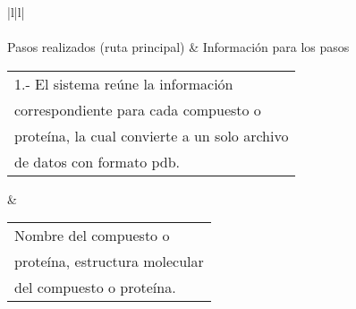 \begin{longtable}{|l|l|}
                                                                                                                                                                                    \\ \hline
{}                                                                                                                                                                                                                                                                                                                                                                                 \\ \hline
Pasos realizados (ruta principal)                                                                                                                                                                                                                    & Información para los pasos                                                                                                                                                       \\ \hline
\begin{tabular}[c]{@{}l@{}}1.- El sistema reúne la información\\ correspondiente para cada compuesto o\\ proteína, la cual convierte a un solo archivo\\ de datos con formato pdb.\end{tabular}                                                      & \begin{tabular}[c]{@{}l@{}}Nombre del compuesto o\\ proteína, estructura molecular\\ del compuesto o proteína.\end{tabular}                                                      \\ \hline
{}                                                                                                                                                                                                                                                                                                                                                                                 \\ \hline

\end{longtable}
